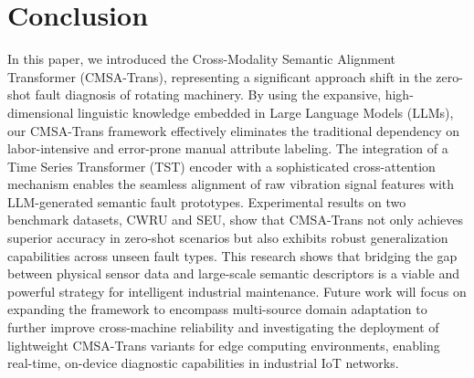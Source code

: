 \section{Conclusion}
In this paper, we introduced the Cross-Modality Semantic Alignment Transformer (CMSA-Trans), representing a significant approach shift in the zero-shot fault diagnosis of rotating machinery. By using the expansive, high-dimensional linguistic knowledge embedded in Large Language Models (LLMs), our CMSA-Trans framework effectively eliminates the traditional dependency on labor-intensive and error-prone manual attribute labeling. The integration of a Time Series Transformer (TST) encoder with a sophisticated cross-attention mechanism enables the seamless alignment of raw vibration signal features with LLM-generated semantic fault prototypes. Experimental results on two benchmark datasets, CWRU and SEU, show that CMSA-Trans not only achieves superior accuracy in zero-shot scenarios but also exhibits robust generalization capabilities across unseen fault types. This research shows that bridging the gap between physical sensor data and large-scale semantic descriptors is a viable and powerful strategy for intelligent industrial maintenance. Future work will focus on expanding the framework to encompass multi-source domain adaptation to further improve cross-machine reliability and investigating the deployment of lightweight CMSA-Trans variants for edge computing environments, enabling real-time, on-device diagnostic capabilities in industrial IoT networks.
